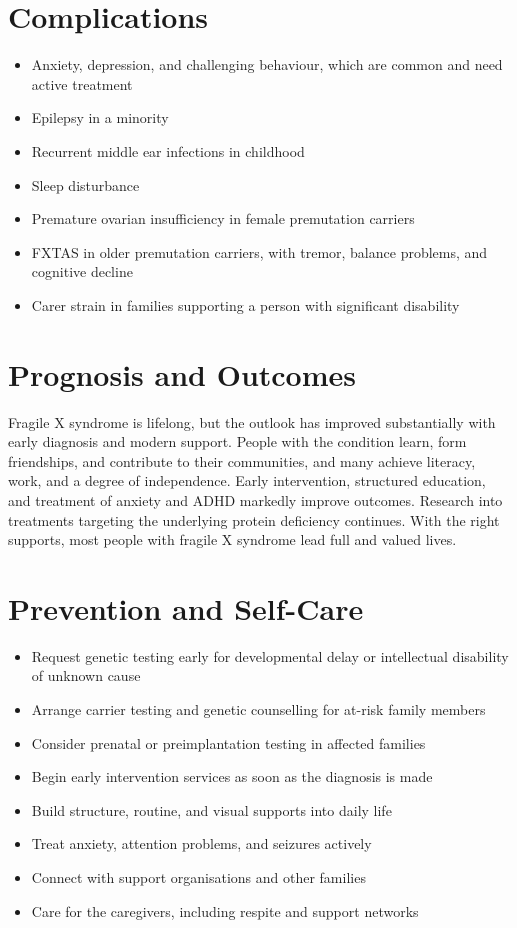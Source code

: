 \section*{Complications}
\begin{itemize}
    \item Anxiety, depression, and challenging behaviour, which are common and need active treatment
    \item Epilepsy in a minority
    \item Recurrent middle ear infections in childhood
    \item Sleep disturbance
    \item Premature ovarian insufficiency in female premutation carriers
    \item FXTAS in older premutation carriers, with tremor, balance problems, and cognitive decline
    \item Carer strain in families supporting a person with significant disability
\end{itemize}

\section*{Prognosis and Outcomes}
Fragile X syndrome is lifelong, but the outlook has improved substantially with early diagnosis and modern support. People with the condition learn, form friendships, and contribute to their communities, and many achieve literacy, work, and a degree of independence. Early intervention, structured education, and treatment of anxiety and ADHD markedly improve outcomes. Research into treatments targeting the underlying protein deficiency continues. With the right supports, most people with fragile X syndrome lead full and valued lives.

\section*{Prevention and Self-Care}
\begin{itemize}
    \item Request genetic testing early for developmental delay or intellectual disability of unknown cause
    \item Arrange carrier testing and genetic counselling for at-risk family members
    \item Consider prenatal or preimplantation testing in affected families
    \item Begin early intervention services as soon as the diagnosis is made
    \item Build structure, routine, and visual supports into daily life
    \item Treat anxiety, attention problems, and seizures actively
    \item Connect with support organisations and other families
    \item Care for the caregivers, including respite and support networks
\end{itemize}

